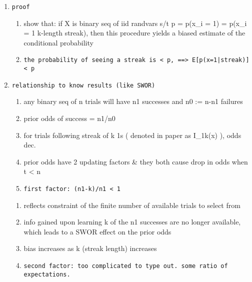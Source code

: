 \documentclass[12pt,twoside]{dukestatscithesis}
\theoremstyle{definition}
\theoremstyle{definition}
\theoremstyle{definition}
\theoremstyle{remark}
\begin{document}
\begin{enumerate}
\def\labelenumi{\arabic{enumi}.}
\item
\begin{verbatim}
proof
\end{verbatim}
  \begin{enumerate}
  \def\labelenumii{\alph{enumii}.}
  \item
    show that: if X is binary seq of iid randvars s/t p = p(x\_i = 1) =
    p(x\_i = 1\textbar{} k-length streak), then this procedure yields a
    biased estimate of the conditional probability
  \item
\begin{verbatim}
the probability of seeing a streak is < p, ==> E[p(x=1|streak)] < p
\end{verbatim}
  \end{enumerate}
\item
\begin{verbatim}
relationship to know results (like SWOR)
\end{verbatim}
  \begin{enumerate}
  \def\labelenumii{\alph{enumii}.}
  \item
    any binary seq of n trials will have n1 successes and n0 := n-n1
    failures
  \item
    prior odds of success = n1/n0
  \item
    for trials following streak of k 1s ( denoted in paper as I\_1k(x)
    ), odds dec.
  \item
    prior odds have 2 updating factors \& they both cause drop in odds
    when t \textless{} n
  \item
\begin{verbatim}
first factor: (n1-k)/n1 < 1
\end{verbatim}
  \end{enumerate}
  \begin{enumerate}
  \def\labelenumii{\roman{enumii}.}
  \setcounter{enumii}{1}
  \item
    reflects constraint of the finite number of available trials to
    select from
  \item
    info gained upon learning k of the n1 successes are no longer
    available, which leads to a SWOR effect on the prior odds
  \item
    bias increases as k (streak length) increases
  \item
\begin{verbatim}
second factor: too complicated to type out. some ratio of expectations.

\end{verbatim}
\end{enumerate}
\end{enumerate}
\end{document}

